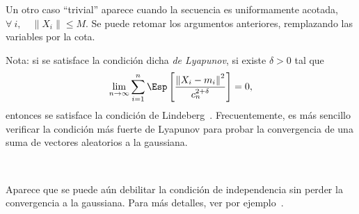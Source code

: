 Un otro caso  ``trivial'' aparece cuando la secuencia  es uniformamente acotada,
\ie \  $\forall \: i, \quad  \| X_i \| \le  M$. Se puede  retomar los argumentos
anteriores, remplazando las variables por la cota.

Nota: si  se satisface  la condici\'on  dicha {\it de  Lyapunov}, \ie  si existe
$\delta > 0$ tal que
%
\[
\lim_{n   \to  \infty}   \sum_{i=1}^n   \Esp\left[  \frac{\left\|   X_i  -   m_i
    \right\|^2}{c_n^{2+\delta}} \right] = 0,
\]
%
entonces         se          satisface         la         condici\'on         de
Lindeberg~\cite{AshDol99}.  Frecuentemente,  es   m\'as  sencillo  verificar  la
condici\'on m\'as fuerte de Lyapunov para  probar la convergencia de una suma de
vectores aleatorios a la gaussiana.

\

Aparece que se puede a\'un  debilitar la condici\'on de independencia sin perder
la   convergencia    a   la   gaussiana.    Para   m\'as   detalles,    ver   por
ejemplo~\cite[Sec.~6.4]{BroDav87}.

\

